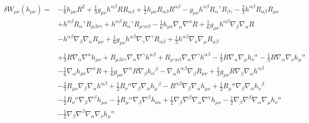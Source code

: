 \documentclass[10pt,letterpaper]{article}
\begin{document}
\begin{align}
\delta W_{\mu\nu}(h_{\mu\nu})={}&- \tfrac{1}{6} h_{\mu \nu} R^2
 + \tfrac{1}{3} g_{\mu \nu} h^{\alpha \beta} R R_{\alpha \beta}
 + \tfrac{1}{2} h_{\mu \nu} R_{\alpha \beta} R^{\alpha \beta}
 -  g_{\mu \nu} h^{\alpha \beta} R_{\alpha}{}^{\gamma} R_{\beta \gamma}
 -  \tfrac{2}{3} h^{\alpha \beta} R_{\alpha \beta} R_{\mu \nu}\nonumber\\
& + h^{\alpha \beta} R_{\alpha}{}^{\gamma} R_{\mu \beta \nu \gamma}
 + h^{\alpha \beta} R_{\alpha}{}^{\gamma} R_{\mu \gamma \nu \beta}
 -  \tfrac{1}{6} h_{\mu \nu} \nabla_{\alpha}\nabla^{\alpha}R
 + \tfrac{1}{6} g_{\mu \nu} h^{\alpha \beta} \nabla_{\beta}\nabla_{\alpha}R\nonumber\\
& -  h^{\alpha \beta} \nabla_{\beta}\nabla_{\alpha}R_{\mu \nu}
 + \tfrac{1}{6} g_{\mu \nu} h^{\alpha \beta} \nabla_{\gamma}\nabla^{\gamma}R_{\alpha \beta}
 + \tfrac{1}{3} h^{\alpha \beta} \nabla_{\nu}\nabla_{\mu}R_{\alpha \beta}\nonumber \\ 
\\
&+\tfrac{1}{3} R \nabla_{\alpha}\nabla^{\alpha}h_{\mu \nu}
 + R_{\mu \beta \nu \gamma} \nabla_{\alpha}\nabla^{\gamma}h^{\alpha \beta}
 + R_{\mu \gamma \nu \beta} \nabla_{\alpha}\nabla^{\gamma}h^{\alpha \beta}
 -  \tfrac{1}{3} R \nabla_{\alpha}\nabla_{\mu}h_{\nu}{}^{\alpha}
 -  \tfrac{1}{3} R \nabla_{\alpha}\nabla_{\nu}h_{\mu}{}^{\alpha}\nonumber\\
& -  \tfrac{1}{6} \nabla_{\alpha}h_{\mu \nu} \nabla^{\alpha}R
 + \tfrac{1}{6} g_{\mu \nu} \nabla^{\alpha}R \nabla_{\beta}h_{\alpha}{}^{\beta}
 -  \nabla_{\alpha}h^{\alpha \beta} \nabla_{\beta}R_{\mu \nu}
 + \tfrac{1}{3} g_{\mu \nu} R \nabla_{\beta}\nabla_{\alpha}h^{\alpha \beta}\nonumber\\
& -  \tfrac{2}{3} R_{\mu \nu} \nabla_{\beta}\nabla_{\alpha}h^{\alpha \beta}
 + \tfrac{1}{2} R_{\nu}{}^{\alpha} \nabla_{\beta}\nabla_{\alpha}h_{\mu}{}^{\beta}
 -  R^{\alpha \beta} \nabla_{\beta}\nabla_{\alpha}h_{\mu \nu}
 + \tfrac{1}{2} R_{\mu}{}^{\alpha} \nabla_{\beta}\nabla_{\alpha}h_{\nu}{}^{\beta}\nonumber\\
& -  \tfrac{1}{2} R_{\nu}{}^{\alpha} \nabla_{\beta}\nabla^{\beta}h_{\mu \alpha}
 -  \tfrac{1}{2} R_{\mu}{}^{\alpha} \nabla_{\beta}\nabla^{\beta}h_{\nu \alpha}
 + \tfrac{1}{2} \nabla_{\beta}\nabla^{\beta}\nabla_{\alpha}\nabla^{\alpha}h_{\mu \nu}
 -  \tfrac{1}{2} \nabla_{\beta}\nabla^{\beta}\nabla_{\alpha}\nabla_{\mu}h_{\nu}{}^{\alpha}\nonumber\\
& -  \tfrac{1}{2} \nabla_{\beta}\nabla^{\beta}\nabla_{\alpha}\nabla_{\nu}h_{\mu}{}^{\alpha}

\end{align}
\end{document}
